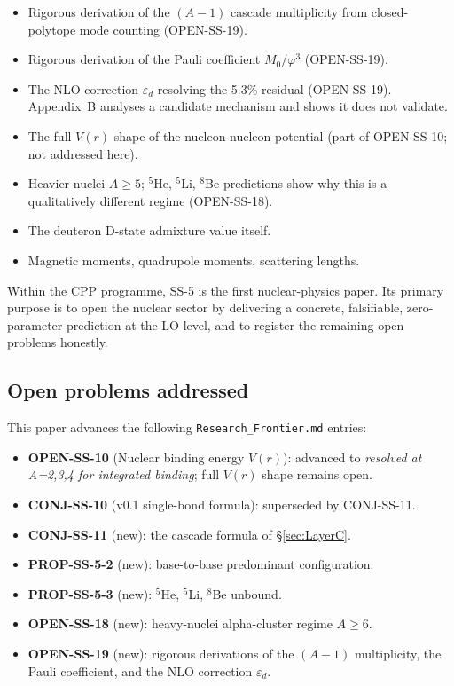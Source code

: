 \documentclass[11pt,letterpaper]{article}
\newcommand{\phig}{\varphi}
\newcommand{\Mzero}{M_0}
\newcommand{\epsd}{\varepsilon_{d}}
\begin{document}
\begin{itemize}
\item Rigorous derivation of the $(A-1)$ cascade multiplicity from closed-polytope mode counting (OPEN-SS-19).
\item Rigorous derivation of the Pauli coefficient $\Mzero/\phig^3$ (OPEN-SS-19).
\item The NLO correction $\epsd$ resolving the 5.3\% residual (OPEN-SS-19). Appendix~B analyses a candidate mechanism and shows it does not validate.
\item The full $V(r)$ shape of the nucleon-nucleon potential (part of OPEN-SS-10; not addressed here).
\item Heavier nuclei $A \geq 5$; ${}^5$He, ${}^5$Li, ${}^8$Be predictions show why this is a qualitatively different regime (OPEN-SS-18).
\item The deuteron D-state admixture value itself.
\item Magnetic moments, quadrupole moments, scattering lengths.
\end{itemize}

Within the CPP programme, SS-5 is the first nuclear-physics paper. Its primary purpose is to open the nuclear sector by delivering a concrete, falsifiable, zero-parameter prediction at the LO level, and to register the remaining open problems honestly.

\subsection{Open problems addressed}

This paper advances the following \texttt{Research\_Frontier.md} entries:
\begin{itemize}
\item \textbf{OPEN-SS-10} (Nuclear binding energy $V(r)$): advanced to \emph{resolved at A=2,3,4 for integrated binding}; full $V(r)$ shape remains open.
\item \textbf{CONJ-SS-10} (v0.1 single-bond formula): superseded by CONJ-SS-11.
\item \textbf{CONJ-SS-11} (new): the cascade formula of §\ref{sec:LayerC}.
\item \textbf{PROP-SS-5-2} (new): base-to-base predominant configuration.
\item \textbf{PROP-SS-5-3} (new): ${}^5$He, ${}^5$Li, ${}^8$Be unbound.
\item \textbf{OPEN-SS-18} (new): heavy-nuclei alpha-cluster regime $A \geq 6$.
\item \textbf{OPEN-SS-19} (new): rigorous derivations of the $(A-1)$ multiplicity, the Pauli coefficient, and the NLO correction $\epsd$.
\end{itemize}
\end{document}

